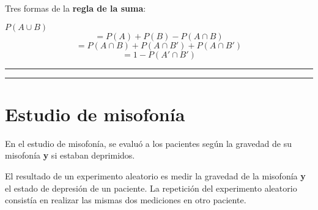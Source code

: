 \documentclass[
]{book}
\begin{document}
Tres formas de la \textbf{regla de la suma}:

\(P(A\cup B)\)\[=P(A) + P(B) - P(A\cap B)\]
\[=P(A \cap B)+P(A\cap B')+P(A\cap B')\]
\[=1-P(A'\cap B')\]

\begin{center}\rule{0.5\linewidth}{0.5pt}\end{center}

\begin{center}\rule{0.5\linewidth}{0.5pt}\end{center}

\hypertarget{estudio-de-misofonuxeda}{%
\section{Estudio de misofonía}\label{estudio-de-misofonuxeda}}

En el estudio de misofonía, se evaluó a los pacientes según la gravedad de su misofonía \textbf{y} si estaban deprimidos.

El resultado de un experimento aleatorio es medir la gravedad de la misofonía \textbf{y} el estado de depresión de un paciente. La repetición del experimento aleatorio consistía en realizar las mismas dos mediciones en otro paciente.
\end{document}
